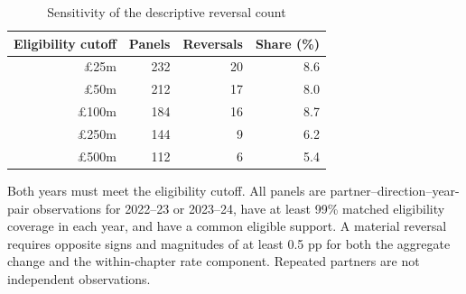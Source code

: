 \begin{table}[!htbp]
\centering
\caption{Sensitivity of the descriptive reversal count}\label{tab:sensitivity}
\small
\begin{tabular}{rrrr}
\toprule
Eligibility cutoff & Panels & Reversals & Share (\%) \\
\midrule
\pounds25m & 232 & 20 & 8.6 \\
\pounds50m & 212 & 17 & 8.0 \\
\pounds100m & 184 & 16 & 8.7 \\
\pounds250m & 144 & 9 & 6.2 \\
\pounds500m & 112 & 6 & 5.4 \\
\bottomrule
\end{tabular}
\par\vspace{3pt}\begin{minipage}{.97\linewidth}\footnotesize Both years must meet the eligibility cutoff. All panels are partner--direction--year-pair observations for 2022--23 or 2023--24, have at least 99\% matched eligibility coverage in each year, and have a common eligible support. A material reversal requires opposite signs and magnitudes of at least 0.5 pp for both the aggregate change and the within-chapter rate component. Repeated partners are not independent observations.\end{minipage}
\end{table}
